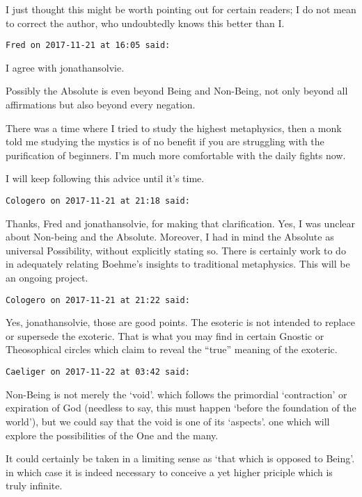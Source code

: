 \begin{footnotesize}
\begin{sffamily}
I just thought this might be worth pointing out for certain readers; I do not mean to correct the author, who undoubtedly knows this better than I.


\hfill

\texttt{Fred on 2017-11-21 at 16:05 said: }

I agree with jonathansolvie.

Possibly the Absolute is even beyond Being and Non-Being, not only beyond all affirmations but also beyond every negation.

There was a time where I tried to study the highest metaphysics, then a monk told me studying the mystics is of no benefit if you are struggling with the purification of beginners. I'm much more comfortable with the daily fights now.

I will keep following this advice until it's time.


\hfill

\texttt{Cologero on 2017-11-21 at 21:18 said: }

Thanks, Fred and jonathansolvie, for making that clarification. Yes, I was unclear about Non-being and the Absolute. Moreover, I had in mind the Absolute as universal Possibility, without explicitly stating so. There is certainly work to do in adequately relating Boehme's insights to traditional metaphysics. This will be an ongoing project.


\hfill

\texttt{Cologero on 2017-11-21 at 21:22 said: }

Yes, jonathansolvie, those are good points. The esoteric is not intended to replace or supersede the exoteric. That is what you may find in certain Gnostic or Theosophical circles which claim to reveal the “true” meaning of the exoteric.


\hfill

\texttt{Caeliger on 2017-11-22 at 03:42 said: }

Non-Being is not merely the `void'. which follows the primordial `contraction' or expiration of God (needless to say, this must happen `before the foundation of the world’), but we could say that the void is one of its `aspects'. one which will explore the possibilities of the One and the many. 

It could certainly be taken in a limiting sense as `that which is opposed to Being'. in which case it is indeed necessary to conceive a yet higher priciple which is truly infinite.


\hfill


\end{sffamily}
\end{footnotesize}
